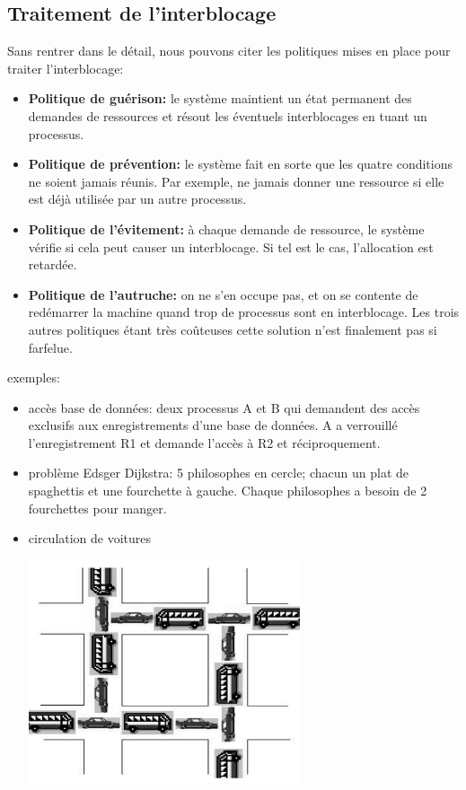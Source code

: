 \documentclass[a4paper,11pt]{article}
\begin{document}
\begin{Form}
\section{Traitement de l'interblocage}
Sans rentrer dans le détail, nous pouvons citer les politiques mises en place pour traiter l'interblocage:
\begin{itemize}
\item \textbf{Politique de guérison:} le système maintient un état permanent des demandes de ressources et résout les éventuels interblocages en tuant un processus.
\item \textbf{Politique de prévention:} le système fait en sorte que les quatre conditions ne soient jamais réunis. Par exemple, ne jamais donner une ressource si elle est déjà utilisée par un autre processus.
\item \textbf{Politique de l'évitement:} à chaque demande de ressource, le système vérifie si cela peut causer un interblocage. Si tel est le cas, l'allocation est retardée.
\item \textbf{Politique de l'autruche:} on ne s'en occupe pas, et on se contente de redémarrer la machine quand trop de processus sont en interblocage. Les trois autres politiques étant très coûteuses cette solution n'est finalement pas si farfelue.
\end{itemize}
\begin{commentprof}
\pagebreak
exemples:
\begin{itemize}
\item accès base de données: deux processus A et B qui demandent des accès exclusifs aux enregistrements d'une base de données. A a verrouillé l'enregistrement R1 et demande l'accès à R2 et réciproquement.
\item problème  Edsger Dijkstra: 5 philosophes en cercle; chacun un plat de spaghettis et une fourchette à gauche. Chaque philosophes a besoin de 2 fourchettes pour manger.
\item circulation de voitures
\begin{center}
\includegraphics[width=8cm]{ressources/circulation.png}
\end{center}
\end{itemize}
\end{commentprof}
\end{Form}
\end{document}
